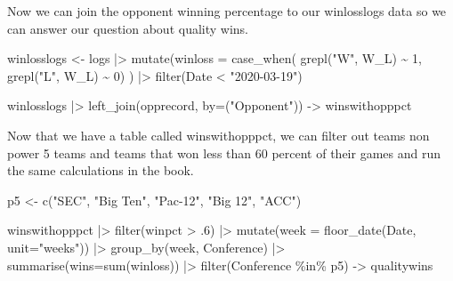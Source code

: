\documentclass[
  letterpaper,
  DIV=11,
  numbers=noendperiod]{scrreprt}
\newenvironment{Shaded}{\begin{snugshade}}{\end{snugshade}}
\newcommand{\AttributeTok}[1]{\textcolor[rgb]{0.40,0.45,0.13}{#1}}
\newcommand{\DecValTok}[1]{\textcolor[rgb]{0.68,0.00,0.00}{#1}}
\newcommand{\FunctionTok}[1]{\textcolor[rgb]{0.28,0.35,0.67}{#1}}
\newcommand{\NormalTok}[1]{\textcolor[rgb]{0.00,0.23,0.31}{#1}}
\newcommand{\OtherTok}[1]{\textcolor[rgb]{0.00,0.23,0.31}{#1}}
\newcommand{\SpecialCharTok}[1]{\textcolor[rgb]{0.37,0.37,0.37}{#1}}
\newcommand{\StringTok}[1]{\textcolor[rgb]{0.13,0.47,0.30}{#1}}
\begin{document}
Now we can join the opponent winning percentage to our winlosslogs data
so we can answer our question about quality wins.

\begin{Shaded}
\begin{Highlighting}[]
\NormalTok{winlosslogs }\OtherTok{\textless{}{-}}\NormalTok{ logs }\SpecialCharTok{|\textgreater{}} 
  \FunctionTok{mutate}\NormalTok{(}\AttributeTok{winloss =} \FunctionTok{case\_when}\NormalTok{(}
    \FunctionTok{grepl}\NormalTok{(}\StringTok{"W"}\NormalTok{, W\_L) }\SpecialCharTok{\textasciitilde{}} \DecValTok{1}\NormalTok{, }
    \FunctionTok{grepl}\NormalTok{(}\StringTok{"L"}\NormalTok{, W\_L) }\SpecialCharTok{\textasciitilde{}} \DecValTok{0}\NormalTok{)}
\NormalTok{) }\SpecialCharTok{|\textgreater{}} 
  \FunctionTok{filter}\NormalTok{(Date }\SpecialCharTok{\textless{}} \StringTok{"2020{-}03{-}19"}\NormalTok{)}
\end{Highlighting}
\end{Shaded}

\begin{Shaded}
\begin{Highlighting}[]
\NormalTok{winlosslogs }\SpecialCharTok{|\textgreater{}} 
  \FunctionTok{left\_join}\NormalTok{(opprecord, }\AttributeTok{by=}\NormalTok{(}\StringTok{"Opponent"}\NormalTok{)) }\OtherTok{{-}\textgreater{}}\NormalTok{ winswithopppct}
\end{Highlighting}
\end{Shaded}

Now that we have a table called winswithopppct, we can filter out teams
non power 5 teams and teams that won less than 60 percent of their games
and run the same calculations in the book.

\begin{Shaded}
\begin{Highlighting}[]
\NormalTok{p5 }\OtherTok{\textless{}{-}} \FunctionTok{c}\NormalTok{(}\StringTok{"SEC"}\NormalTok{, }\StringTok{"Big Ten"}\NormalTok{, }\StringTok{"Pac{-}12"}\NormalTok{, }\StringTok{"Big 12"}\NormalTok{, }\StringTok{"ACC"}\NormalTok{)}
\end{Highlighting}
\end{Shaded}

\begin{Shaded}
\begin{Highlighting}[]
\NormalTok{winswithopppct }\SpecialCharTok{|\textgreater{}} 
  \FunctionTok{filter}\NormalTok{(winpct }\SpecialCharTok{\textgreater{}}\NormalTok{ .}\DecValTok{6}\NormalTok{) }\SpecialCharTok{|\textgreater{}} 
  \FunctionTok{mutate}\NormalTok{(}\AttributeTok{week =} \FunctionTok{floor\_date}\NormalTok{(Date, }\AttributeTok{unit=}\StringTok{"weeks"}\NormalTok{)) }\SpecialCharTok{|\textgreater{}} 
  \FunctionTok{group\_by}\NormalTok{(week, Conference) }\SpecialCharTok{|\textgreater{}} 
  \FunctionTok{summarise}\NormalTok{(}\AttributeTok{wins=}\FunctionTok{sum}\NormalTok{(winloss)) }\SpecialCharTok{|\textgreater{}} 
  \FunctionTok{filter}\NormalTok{(Conference }\SpecialCharTok{\%in\%}\NormalTok{ p5) }\OtherTok{{-}\textgreater{}}\NormalTok{ qualitywins}
\end{Highlighting}
\end{Shaded}
\end{document}
